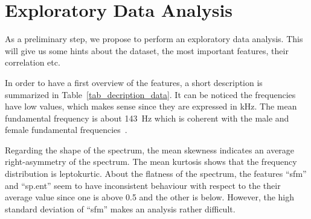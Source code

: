 \chapter{Exploratory Data Analysis}
\label{chapter_data_exploration}

As a preliminary step, we propose to perform an exploratory data analysis. This will give us some hints about the dataset, \eg the most important features, their correlation etc.

In order to have a first overview of the features, a short description is summarized in Table~\ref{tab_decription_data}. It can be noticed the frequencies have low values, which makes sense since they are expressed in \si{\kilo\hertz}. 
The mean fundamental frequency is about \SI{143}{\hertz} which is coherent with the male and female fundamental frequencies~\cite{Traunmller1994}. 

Regarding the shape of the spectrum, the mean skewness indicates an average right-asymmetry of the spectrum. The mean kurtosis shows that the frequency distribution is leptokurtic. About the flatness of the spectrum, the features ``sfm'' and ``sp.ent'' seem to have inconsistent behaviour with respect to the their average value since one is above \num{0.5} and the other is below. However, the high standard deviation of ``sfm'' makes an analysis rather difficult.

